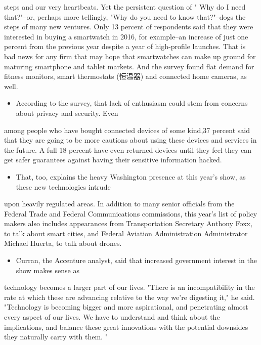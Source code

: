 \documentclass[UTF8,11pt]{ctexart}
\begin{document}
steps and our very heartbeats. Yet the persistent question of " Why do I need that?"--or, perhaps more tellingly, "Why do you need to know that?"--dogs the steps of many new ventures. Only 13 percent of respondents said that they were interested in buying a smartwatch in 2016, for example--an increase of just one percent from the previous year despite a year of high-profile launches. That is bad news for any firm that may hope that smartwatches can make up ground for maturing smartphone and tablet markets. And the survey found flat demand for fitness monitors, smart thermostats (恒温器) and connected home cameras, as well.


\begin{itemize}[leftmargin=2em,itemsep=.2em,topsep=.4em]\item[J.] According to the survey, that lack of enthusiasm could stem from concerns about privacy and security. Even
\end{itemize}

among people who have bought connected devices of some kind,37 percent said that they are going to be more cautions about using these devices and services in the future. A full 18 percent have even returned devices until they feel they can get safer guarantees against having their sensitive information hacked.


\begin{itemize}[leftmargin=2em,itemsep=.2em,topsep=.4em]\item[K.] That, too, explains the heavy Washington presence at this year's show, as these new technologies intrude
\end{itemize}

upon heavily regulated areas. In addition to many senior officials from the Federal Trade and Federal Communications commissions, this year's list of policy makers also includes appearances from Transportation Secretary Anthony Foxx, to talk about smart cities, and Federal Aviation Administration Administrator Michael Huerta, to talk about drones.


\begin{itemize}[leftmargin=2em,itemsep=.2em,topsep=.4em]\item[L.] Curran, the Accenture analyst, said that increased government interest in the show makes sense as
\end{itemize}

technology becomes a larger part of our lives. "There is an incompatibility in the rate at which these are advancing relative to the way we're digesting it," he said. "Technology is becoming bigger and more aspirational, and penetrating almost every aspect of our lives. We have to understand and think about the implications, and balance these great innovations with the potential downsides they naturally carry with them. "
\end{document}
